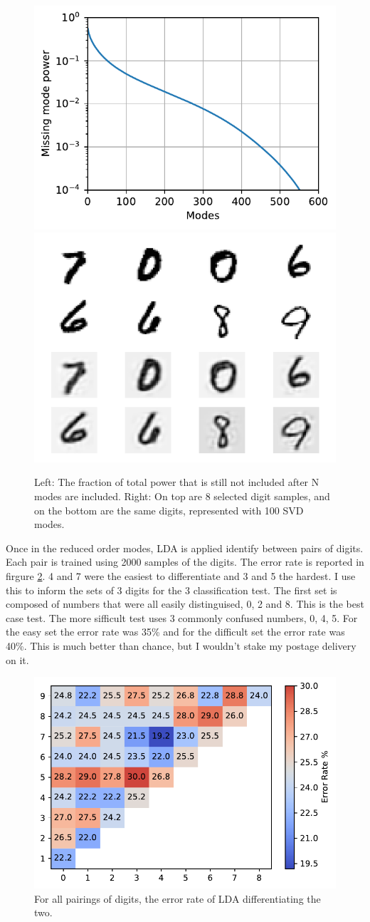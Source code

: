 \documentclass{article}
\begin{document}
    \begin{figure}[tbp]
        \includegraphics[width=.48\textwidth]{mode_frac.pdf}
        \includegraphics[width=.48\textwidth]{reduced_dim.png}
        \caption{\label{fig:modes} Left: The fraction of total power that is
        still not included after N modes are included. Right: On top are 8
        selected digit samples, and on the bottom are the same digits,
        represented with 100 SVD modes.}
    \end{figure}

    Once in the reduced order modes, LDA is applied identify between pairs of
    digits. Each pair is trained using 2000 samples of the digits. The error
    rate is reported in firgure \ref{fig:lda}. 4 and 7 were the easiest to
    differentiate and 3 and 5 the hardest. I use this to inform
    the sets of 3 digits for the 3 classification test. The first set is
    composed of numbers that were all easily distinguised, 0, 2 and 8. This is
    the best case test. The more sifficult test uses 3 commonly confused numbers,
    0, 4, 5. For the easy set the error rate was 35\% and for the difficult set
    the error rate was 40\%. This is much better than chance, but I wouldn't
    stake my postage delivery on it.

    \begin{figure}[tbp]
        \centering
        \includegraphics[width=.49\textwidth]{LDA-digits_conf.pdf}
        \caption{\label{fig:lda} For all pairings of digits, the error rate
        of LDA differentiating the two.}
    \end{figure}
\end{document}
